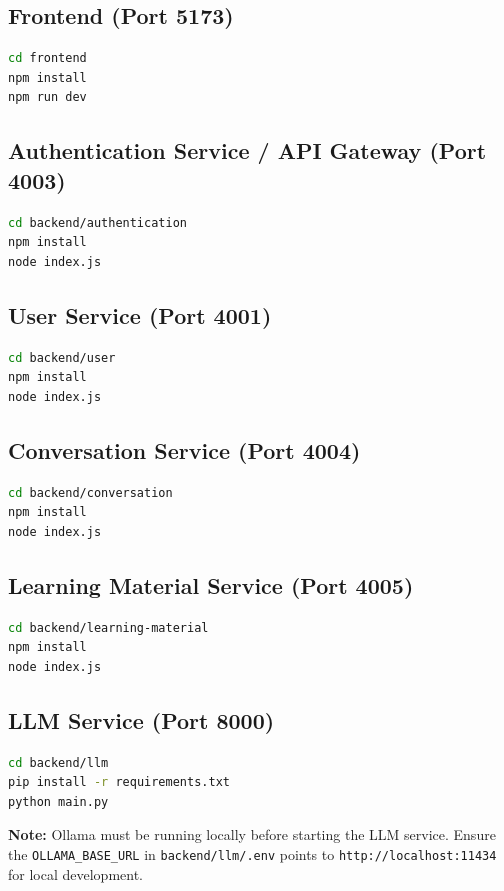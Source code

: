 \documentclass[a4paper,12pt]{report}
\begin{document}
\subsection{Frontend (Port 5173)}
\begin{lstlisting}[language=bash]
cd frontend
npm install
npm run dev
\end{lstlisting}

\subsection{Authentication Service / API Gateway (Port 4003)}
\begin{lstlisting}[language=bash]
cd backend/authentication
npm install
node index.js
\end{lstlisting}

\subsection{User Service (Port 4001)}
\begin{lstlisting}[language=bash]
cd backend/user
npm install
node index.js
\end{lstlisting}

\subsection{Conversation Service (Port 4004)}
\begin{lstlisting}[language=bash]
cd backend/conversation
npm install
node index.js
\end{lstlisting}

\subsection{Learning Material Service (Port 4005)}
\begin{lstlisting}[language=bash]
cd backend/learning-material
npm install
node index.js
\end{lstlisting}

\subsection{LLM Service (Port 8000)}
\begin{lstlisting}[language=bash]
cd backend/llm
pip install -r requirements.txt
python main.py
\end{lstlisting}

\textbf{Note:} Ollama must be running locally before starting the LLM service. Ensure the \texttt{OLLAMA\_BASE\_URL} in \texttt{backend/llm/.env} points to \texttt{http://localhost:11434} for local development.
\end{document}
